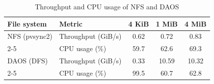 \begin{table}[!htbp]
\centering
\caption{Throughput and CPU usage of NFS and DAOS}
\label{tab:cmp_daos-vs-nfs}

 \renewcommand{\arraystretch}{1.1}
\begin{tabular}{|l|l|c|c|c|}
\hline
File system & Metric & 4 KiB & 1 MiB & 4 MiB \\
\hline
NFS (pvsync2) & Throughput (GiB/s) & 0.62 & 0.72 & 0.83 \\
\cline{2-5}
              & CPU usage (\%)     & 59.7 & 62.6 & 69.3 \\
\hline
DAOS (DFS)    & Throughput (GiB/s) & 0.33 & 10.59 & 10.32\\
\cline{2-5}
              & CPU usage (\%)     & 99.5 & 60.7 & 62.8\\
\hline
\end{tabular}

\end{table}
